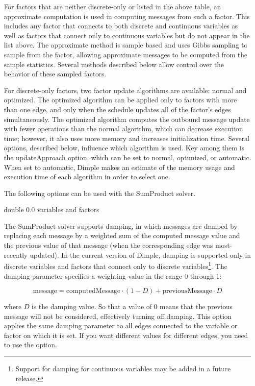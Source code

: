 For factors that are neither discrete-only or listed in the above table, an approximate computation is used in computing messages from such a factor.  This includes any factor that connects to both discrete and continuous variables as well as factors that connect only to continuous variables but do not appear in the list above.  The approximate method is sample based and uses Gibbs sampling to sample from the factor, allowing approximate messages to be computed from the sample statistics.  Several methods described below allow control over the behavior of these sampled factors.

For discrete-only factors, two factor update algorithms are available: normal and optimized. The optimized algorithm can be applied only to factors with more than one edge, and only when the schedule updates all of the factor's edges simultaneously. The optimized algorithm computes the outbound message update with fewer operations than the normal algorithm, which can decrease execution time; however, it also uses more memory and increases initialization time. Several options, described below, influence which algorithm is used. Key among them is the updateApproach option, which can be set to normal, optimized, or automatic. When set to automatic, Dimple makes an estimate of the memory usage and execution time of each algorithm in order to select one.

\label{sec:SumProductOptions}

The following options can be used with the SumProduct solver.


{double}
{0.0}
{variables and factors}
{The SumProduct solver supports damping, in which messages are damped by replacing each message by a weighted sum of the computed message value and the previous value of that message (when the corresponding edge was most-recently updated). In the current version of Dimple, damping is supported only in discrete variables and factors that connect only to discrete variables\footnote{Support for damping for continuous variables may be added in a future release.}.
\linebreak
\linebreak
The damping parameter specifies a weighting value in the range 0 through 1:

\[
\mathrm{message} = \mathrm{computedMessage} \cdot (1 - D) + \mathrm{previousMessage} \cdot D
\]

where $D$ is the damping value. So that a value of 0 means that the previous message will not be considered, effectively turning off damping.
\linebreak
\linebreak
This option applies the same damping parameter to all edges connected to the variable or factor on which it is set. If you want different values for different edges, you need to use the  option.
}

